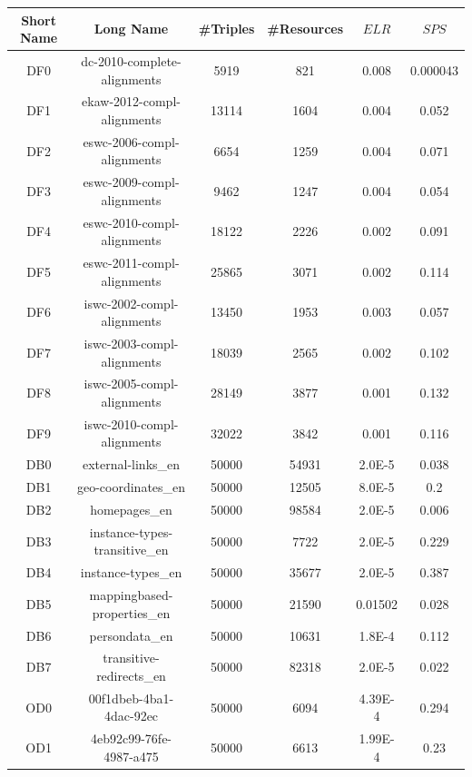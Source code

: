 \FloatBarrier
\begin{center}
	\begin{tabular}{|c|c|c|c|c|c|}
		\hline 
		Short Name & Long Name & \#Triples & \#Resources & $ELR$ & $SPS$ \\ 
		\hline
		DF0 & dc-2010-complete-alignments & 5919 & 821 & 0.008 & 0.000043 \\
		\hline
		DF1 & ekaw-2012-compl-alignments & 13114 & 1604 & 0.004 & 0.052 \\
		\hline
		DF2 & eswc-2006-compl-alignments & 6654 & 1259 & 0.004 & 0.071 \\
		\hline
		DF3 & eswc-2009-compl-alignments & 9462 & 1247 & 0.004 & 0.054 \\
		\hline
		DF4 & eswc-2010-compl-alignments & 18122 & 2226 & 0.002 & 0.091 \\
		\hline
		DF5 & eswc-2011-compl-alignments & 25865 & 3071 & 0.002 & 0.114 \\
		\hline
		DF6 & iswc-2002-compl-alignments & 13450 & 1953 & 0.003 & 0.057 \\
		\hline
		DF7 & iswc-2003-compl-alignments & 18039 & 2565 & 0.002 & 0.102 \\
		\hline
		DF8 & iswc-2005-compl-alignments & 28149 & 3877 & 0.001 & 0.132 \\
		\hline
		DF9 & iswc-2010-compl-alignments & 32022 & 3842 & 0.001 & 0.116 \\
		\hline 
		\hline
		DB0 & external-links\_en & 50000 & 54931 & 2.0E-5 & 0.038 \\
		\hline
		DB1 & geo-coordinates\_en & 50000 & 12505 & 8.0E-5 & 0.2 \\
		\hline
		DB2 & homepages\_en & 50000 & 98584 & 2.0E-5 & 0.006 \\
		\hline
		DB3 & instance-types-transitive\_en & 50000 & 7722 & 2.0E-5 & 0.229 \\
		\hline
		DB4 & instance-types\_en & 50000 & 35677 & 2.0E-5 & 0.387 \\
		\hline
		DB5 & mappingbased-properties\_en & 50000 & 21590 & 0.01502 & 0.028 \\
		\hline
		DB6 & persondata\_en & 50000 & 10631 & 1.8E-4 & 0.112 \\
		\hline
		DB7 & transitive-redirects\_en & 50000 & 82318 & 2.0E-5 & 0.022 \\
		\hline
		\hline
		OD0 & 00f1dbeb-4ba1-4dac-92ec & 50000 & 6094 & 4.39E-4 & 0.294 \\
		\hline
		OD1 & 4eb92c99-76fe-4987-a475 & 50000 & 6613 & 1.99E-4 & 0.23 \\

\end{tabular}
\end{center}
